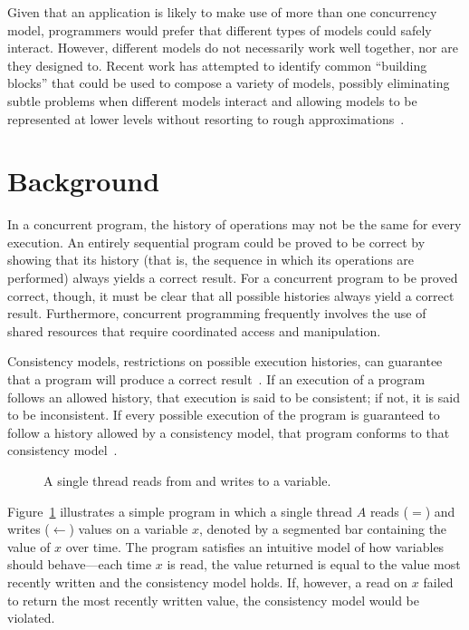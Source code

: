 \documentclass{sig-alternate}
\begin{document}
Given that an application is likely to make use of more than one concurrency model, programmers would prefer that different types of models could safely interact. However, different models do not necessarily work well together, nor are they designed to. Recent work has attempted to identify common ``building blocks'' that could be used to compose a variety of models, possibly eliminating subtle problems when different models interact and allowing models to be represented at lower levels without resorting to rough approximations~\cite{Marr2012, Swalens2014, Ziv2015}.

\section{Background}

In a concurrent program, the history of operations may not be the same for every execution. An entirely sequential program could be proved to be correct by showing that its history (that is, the sequence in which its operations are performed) always yields a correct result. For a concurrent program to be proved correct, though, it must be clear that all possible histories always yield a correct result. Furthermore, concurrent programming frequently involves the use of shared resources that require coordinated access and manipulation.

Consistency models, restrictions on possible execution histories, can guarantee that a program will produce a correct result~\cite{Ziv2015}. If an execution of a program follows an allowed history, that execution is said to be consistent; if not, it is said to be inconsistent. If every possible execution of the program is guaranteed to follow a history allowed by a consistency model, that program conforms to that consistency model~\cite{Kingsbury2014}.

\begin{figure}[ht]
  \centering
  \resizebox{0.95\linewidth}{!}{}
  \caption{A single thread reads from and writes to a variable.}
\label{figure:single}
\end{figure}

Figure~\ref{figure:single} illustrates a simple program in which a single thread $A$ reads ($=$) and writes ($\leftarrow$) values on a variable $x$, denoted by a segmented bar containing the value of $x$ over time. The program satisfies an intuitive model of how variables should behave---each time $x$ is read, the value returned is equal to the value most recently written and the consistency model holds. If, however, a read on $x$ failed to return the most recently written value, the consistency model would be violated.
\end{document}
